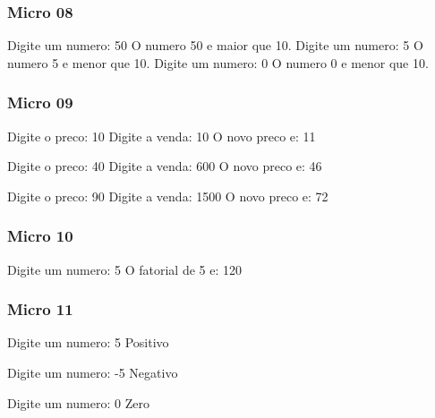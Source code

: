 \documentclass[12pt,a4paper,twoside]{report}
\begin{document}
\subsubsection{Micro 08}


\begin{terminal}
Digite um numero: 50
O numero 50 e maior que 10.
Digite um numero: 5
O numero 5 e menor que 10.
Digite um numero: 0
O numero 0 e menor que 10.
\end{terminal}

\subsubsection{Micro 09}


\begin{terminal}
Digite o preco: 10
Digite a venda: 10
O novo preco e: 11

Digite o preco: 40
Digite a venda: 600
O novo preco e: 46

Digite o preco: 90
Digite a venda: 1500
O novo preco e: 72
\end{terminal}

\subsubsection{Micro 10}


\begin{terminal}
Digite um numero: 5
O fatorial de 5 e: 120
\end{terminal}

\subsubsection{Micro 11}


\begin{terminal}
Digite um numero: 5
Positivo

Digite um numero: -5
Negativo

Digite um numero: 0
Zero
\end{terminal}


\clearpage
{}
\appendix
\end{document}
